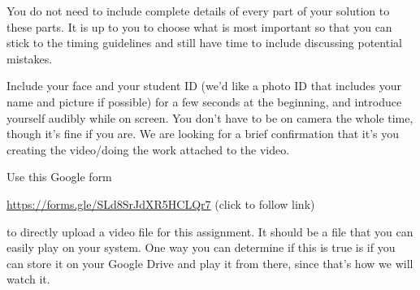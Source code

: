 You do not need to include complete details of every part of your solution to these parts. 
It is up to you to choose what is most important so that you can stick to the 
timing guidelines and still have time to include discussing potential mistakes.

Include your face and your student ID (we'd like a photo ID that includes your name 
and picture if possible) for a few seconds at the beginning, and introduce yourself 
audibly while on screen. You don't have to be on camera the whole time, though it's fine 
if you are. We are looking for a brief confirmation that it's you creating the 
video/doing the work attached to the video.

Use this Google form

\url{https://forms.gle/SLd8SrJdXR5HCLQr7}  (click to follow link) 

to directly upload a video file for this assignment.
It should be a file that you can easily play on your system. 
One way you can determine if this is true is if you can store it on your Google Drive and play it from there,
since that's how we will watch it.

